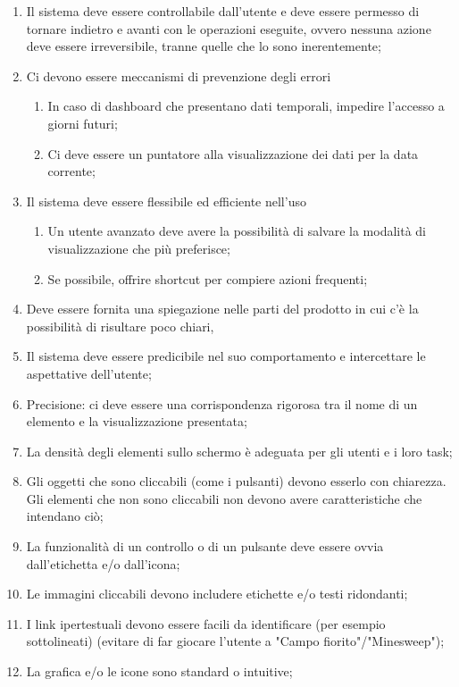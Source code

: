 \begin{enumerate}
    \item Il sistema deve essere controllabile dall'utente e deve essere permesso di tornare indietro e avanti con le operazioni eseguite, ovvero nessuna azione deve essere irreversibile, tranne quelle che lo sono inerentemente;
    \item Ci devono essere meccanismi di prevenzione degli errori
    \begin{enumerate}
        \item In caso di dashboard che presentano dati temporali, impedire l'accesso a giorni futuri;
        \item Ci deve essere un puntatore alla visualizzazione dei dati per la data corrente;
    \end{enumerate}
    \item Il sistema deve essere flessibile ed efficiente nell'uso
    \begin{enumerate}
        \item Un utente avanzato deve avere la possibilità di salvare la modalità di visualizzazione che più preferisce;
        \item Se possibile, offrire shortcut per compiere azioni frequenti;
    \end{enumerate}
    \item Deve essere fornita una spiegazione nelle parti del prodotto in cui c'è la possibilità di risultare poco chiari,
    \item Il sistema deve essere predicibile nel suo comportamento e intercettare le aspettative dell'utente;
    \item Precisione: ci deve essere una corrispondenza rigorosa tra il nome di un elemento e la visualizzazione presentata;
    \item La densità degli elementi sullo schermo è adeguata per gli utenti e i loro task;
    \item Gli oggetti che sono cliccabili (come i pulsanti) devono esserlo con chiarezza. Gli elementi che non sono cliccabili non devono avere caratteristiche che intendano ciò;
    \item La funzionalità di un controllo o di un pulsante deve essere ovvia dall'etichetta e/o dall'icona;
    \item Le immagini  cliccabili devono includere etichette e/o testi ridondanti;
    \item I link ipertestuali devono essere facili da identificare (per esempio sottolineati) (evitare di far giocare l'utente a "Campo fiorito"/"Minesweep");
    \item La grafica e/o le icone sono standard o intuitive;

\end{enumerate}
